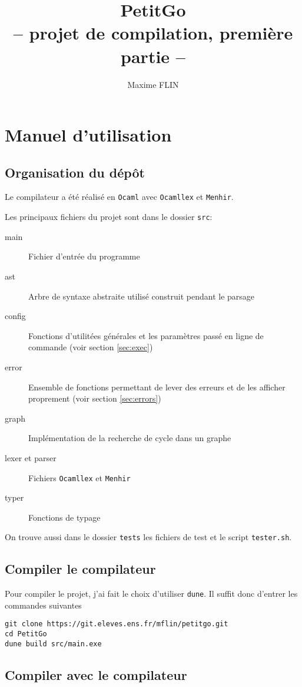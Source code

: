 \documentclass{article}
\title{
  PetitGo \\
  \large -- projet de compilation, première partie --}
\author{Maxime FLIN}
\begin{document}
\maketitle

\section{Manuel d'utilisation}
\subsection{Organisation du dépôt}
Le compilateur a été réalisé en \texttt{Ocaml} avec \texttt{Ocamllex} et \texttt{Menhir}.

Les principaux fichiers du projet sont dans le dossier \texttt{src}:

\begin{description}
\item[main] Fichier d'entrée du programme
\item[ast] Arbre de syntaxe abstraite utilisé construit pendant le parsage
\item[config] Fonctions d'utilitées générales et les paramètres passé en ligne de commande (voir section \ref{sec:exec})
\item[error] Ensemble de fonctions permettant de lever des erreurs et de les afficher proprement (voir section \ref{sec:errors})
\item[graph] Implémentation de la recherche de cycle dans un graphe
\item[lexer et parser] Fichiers \texttt{Ocamllex} et \texttt{Menhir}
\item[typer] Fonctions de typage
\end{description}

On trouve aussi dans le dossier \texttt{tests} les fichiers de test et le script \texttt{tester.sh}.

\subsection{Compiler le compilateur}

Pour compiler le projet, j'ai fait le choix d'utiliser \texttt{dune}. Il suffit donc d'entrer les commandes suivantes

\begin{verbatim}
git clone https://git.eleves.ens.fr/mflin/petitgo.git
cd PetitGo
dune build src/main.exe
\end{verbatim}

\subsection{Compiler avec le compilateur\label{sec:exec}}
\end{document}
